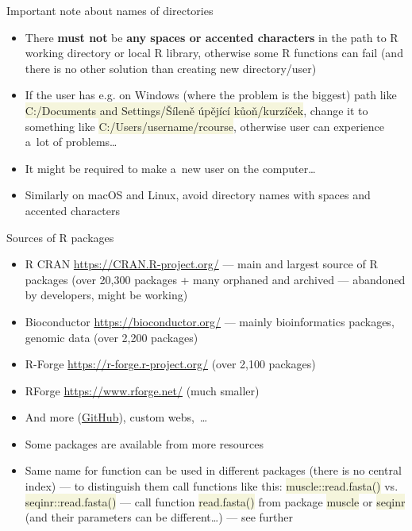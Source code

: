 \documentclass[compress, xelatex, 11pt, xcolor=svgnames, aspectratio=169,
	hyperref={
		bookmarks=true,
		unicode=true,
		colorlinks=true,
		pdftitle={Molecular data in R},
		plainpages=false,
		pdfauthor={Vojtech Zeisek},
		pdfsubject={Course about phylogeny and evolution in R},
		pdfcreator={XeLaTeX},
		pdfkeywords={R, evolution, phylogeny, molecular data},
		linkcolor=Crimson, %
		anchorcolor=Magenta, %
		citecolor=Magenta, %
		filecolor=Magenta, %
		menucolor=Magenta, %
		urlcolor=DodgerBlue, %
		},
	url={hyphens, lowtilde} %
	]{beamer}
\renewcommand{\texttt}[1]{\colorbox{Beige}{{\ttfamily #1}}}
\begin{document}
\begin{frame}{Important note about names of directories}
	\begin{itemize}
		\item \alert{There \textbf{must not} be \textbf{any spaces or accented characters} in the path to R working directory or local R library}, otherwise some R functions can fail (and there is no other solution than creating new directory/user)
		\item If the user has e.g. on Windows (where the problem is the biggest) path like \texttt{C:/Documents and Settings/Šíleně úpějící kůoň/kurzíček}, change it to something like \texttt{C:/Users/username/rcourse}, otherwise user can experience a~lot of problems\ldots
		\item It might be required to make a~new user on the computer\ldots
		\item Similarly on macOS and Linux, avoid directory names with spaces and accented characters
	\end{itemize}
\end{frame}

\begin{frame}{Sources of R packages}
	\label{sources}
	\begin{itemize}
		\item R CRAN \url{https://CRAN.R-project.org/} --- main and largest source of R packages (over 20,300 packages + many orphaned and archived --- abandoned by developers, might be working)
		\item Bioconductor \url{https://bioconductor.org/} --- mainly bioinformatics packages, genomic data (over 2,200 packages)
		\item R-Forge \url{https://r-forge.r-project.org/} (over 2,100 packages)
		\item RForge \url{https://www.rforge.net/} (much smaller)
		\item And more (\href{https://github.com/}{GitHub}), custom webs,~\ldots
		\item Some packages are available from more resources
		\item Same name for function can be used in different packages (there is no central index) --- to distinguish them call functions like this: \texttt{muscle::read.fasta()} vs. \texttt{seqinr::read.fasta()} --- call function \texttt{read.fasta()} from package \texttt{muscle} \alert{or} \texttt{seqinr} (and their parameters can be different\ldots) --- see further
	\end{itemize}
\end{frame}
\end{document}
